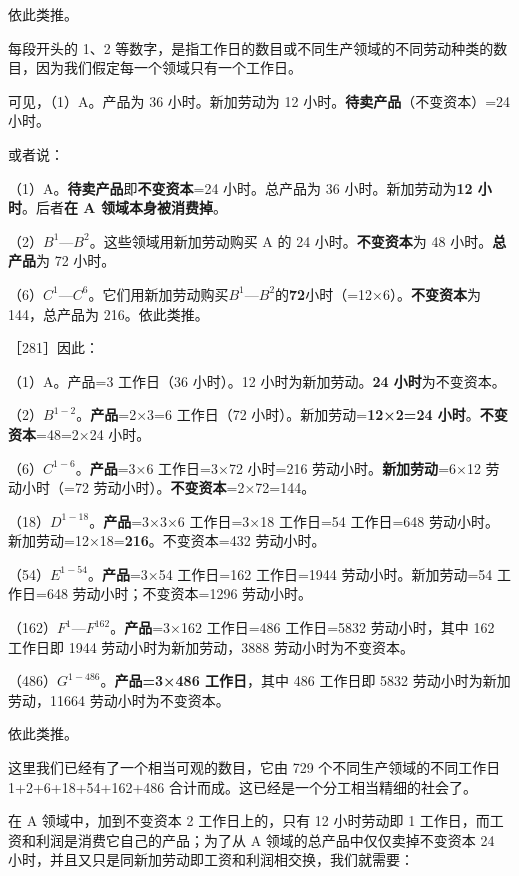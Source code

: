 依此类推。

每段开头的 1、2 等数字，是指工作日的数目或不同生产领域的不同劳动种类的数目，因为我们假定每一个领域只有一个工作日。

可见，（1）A。产品为 36 小时。新加劳动为 12 小时。\textbf{待卖产品}（不变资本）=24 小时。

或者说：

（1）A。\textbf{待卖产品}即\textbf{不变资本}=24 小时。总产品为 36 小时。新加劳动为\textbf{12 小时}。后者\textbf{在 A 领域本身被消费掉}。

（2）$B^{1}$—$B^{2}$。这些领域用新加劳动购买 A 的 24 小时。\textbf{不变资本}为 48 小时。\textbf{总产品}为 72 小时。

（6）$C^{1}$—$C^{6}$。它们用新加劳动购买$B^{1}$—$B^{2}$的\textbf{72}小时（=12×6）。\textbf{不变资本}为 144，总产品为 216。依此类推。

［281］因此：

（1）A。产品=3 工作日（36 小时）。12 小时为新加劳动。\textbf{24 小时}为不变资本。

（2）$B^{1-2}$。\textbf{产品}=2×3=6 工作日（72 小时）。新加劳动=\textbf{12×2=24 小时}。\textbf{不变资本}=48=2×24 小时。

（6）$C^{1-6}$。\textbf{产品}=3×6 工作日=3×72 小时=216 劳动小时。\textbf{新加劳动}=6×12 劳动小时（=72 劳动小时）。\textbf{不变资本}=2×72=144。

（18）$D^{1-18}$。\textbf{产品}=3×3×6 工作日=3×18 工作日=54 工作日=648 劳动小时。新加劳动=12×18=\textbf{216}。不变资本=432 劳动小时。

（54）$E^{1-54}$。\textbf{产品}=3×54 工作日=162 工作日=1944 劳动小时。新加劳动=54 工作日=648 劳动小时；不变资本=1296 劳动小时。

（162）$F^{1}$—$F^{162}$。\textbf{产品}=3×162 工作日=486 工作日=5832 劳动小时，其中 162 工作日即 1944 劳动小时为新加劳动，3888 劳动小时为不变资本。

（486）$G^{1-486}$。\textbf{产品=3×486 工作日}，其中 486 工作日即 5832 劳动小时为新加劳动，11664 劳动小时为不变资本。

依此类推。

这里我们已经有了一个相当可观的数目，它由 729 个不同生产领域的不同工作日 1+2+6+18+54+162+486 合计而成。这已经是一个分工相当精细的社会了。

在 A 领域中，加到不变资本 2 工作日上的，只有 12 小时劳动即 1 工作日，而工资和利润是消费它自己的产品；为了从 A 领域的总产品中仅仅卖掉不变资本 24 小时，并且又只是同新加劳动即工资和利润相交换，我们就需要：

